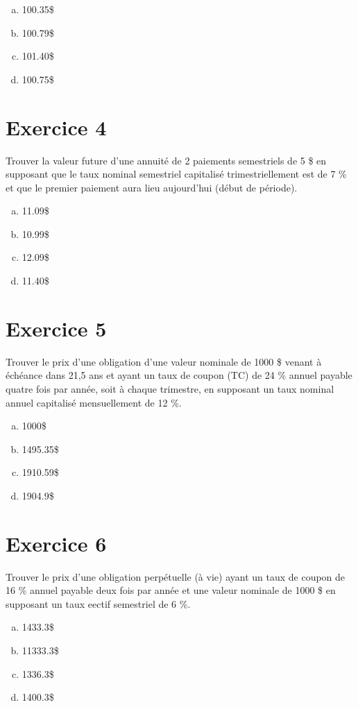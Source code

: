 \documentclass[10pt,a4paper]{article}
\begin{document}
\begin{enumerate}[a)]
\item 100.35\$
\item 100.79\$
\item 101.40\$
\item 100.75\$
\end{enumerate}


\section*{Exercice 4}
Trouver la valeur future d’une annuité de 2 paiements semestriels de 5 \$ en supposant que le taux nominal semestriel capitalisé trimestriellement est de 7 \% et que le premier paiement aura lieu aujourd'hui (début de période).

\begin{enumerate}[a)]
\item 11.09\$
\item 10.99\$
\item 12.09\$
\item 11.40\$
\end{enumerate}


\section*{Exercice 5}
Trouver le prix d’une obligation d’une valeur nominale de 1000 \$ venant à échéance dans 21,5 ans et ayant un taux de coupon (TC) de 24 \% annuel payable quatre fois par année, soit à chaque trimestre, en supposant un taux nominal annuel capitalisé mensuellement de 12 \%.

\begin{enumerate}[a)]
\item 1000\$
\item 1495.35\$
\item 1910.59\$
\item 1904.9\$
\end{enumerate}

\section*{Exercice 6}
Trouver le prix d’une obligation perpétuelle (à vie) ayant un taux de coupon de 16 \% annuel payable deux fois par année et une valeur nominale de 1000 \$ en supposant un taux eectif semestriel de 6 \%.

\begin{enumerate}[a)]
\item 1433.3\$
\item 11333.3\$
\item 1336.3\$
\item 1400.3\$
\end{enumerate}
\end{document}
